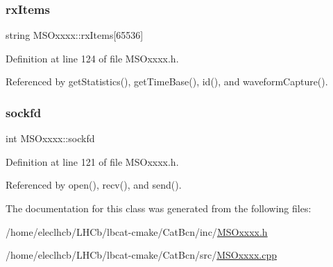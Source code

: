 \subsubsection{\texorpdfstring{rx\+Items}{rxItems}}
{\footnotesize\ttfamily string M\+S\+Oxxxx\+::rx\+Items\mbox{[}65536\mbox{]}\hspace{0.3cm}{\ttfamily [private]}}



Definition at line 124 of file M\+S\+Oxxxx.\+h.



Referenced by get\+Statistics(), get\+Time\+Base(), id(), and waveform\+Capture().

\mbox{\label{classMSOxxxx_acf030a8f1ddd78d632816c856f50455c}} 
\subsubsection{\texorpdfstring{sockfd}{sockfd}}
{\footnotesize\ttfamily int M\+S\+Oxxxx\+::sockfd\hspace{0.3cm}{\ttfamily [private]}}



Definition at line 121 of file M\+S\+Oxxxx.\+h.



Referenced by open(), recv(), and send().



The documentation for this class was generated from the following files\+:\begin{DoxyCompactItemize}
\item 
/home/eleclhcb/\+L\+H\+Cb/lbcat-\/cmake/\+Cat\+Bcn/inc/\hyperlink{MSOxxxx_8h}{M\+S\+Oxxxx.\+h}\item 
/home/eleclhcb/\+L\+H\+Cb/lbcat-\/cmake/\+Cat\+Bcn/src/\hyperlink{MSOxxxx_8cpp}{M\+S\+Oxxxx.\+cpp}\end{DoxyCompactItemize}
